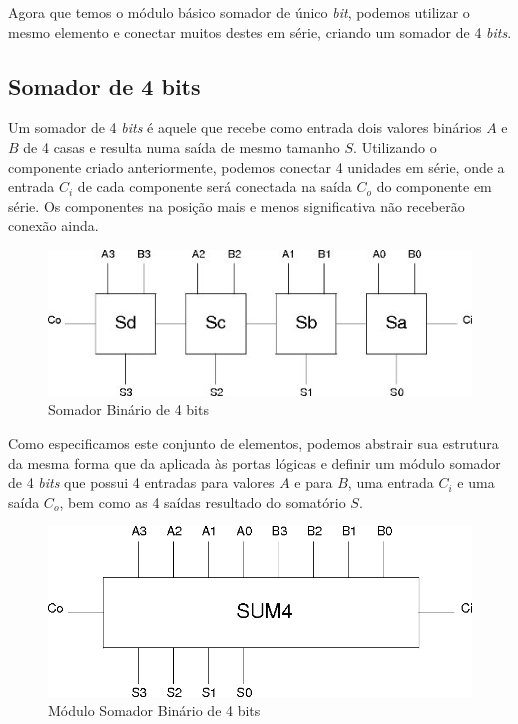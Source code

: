 \documentclass{article}
\begin{document}
Agora que temos o módulo básico somador de único \textit{bit}, podemos utilizar
o mesmo elemento e conectar muitos destes em série, criando um somador de 4
\textit{bits}.

\subsection{Somador de 4 bits}
\label{sec:somador-de-4-bits}

Um somador de 4 \textit{bits} é aquele que recebe como entrada dois valores
binários $A$ e $B$ de 4 casas e resulta numa saída de mesmo tamanho $S$.
Utilizando o componente criado anteriormente, podemos conectar 4 unidades em
série, onde a entrada $C_i$ de cada componente será conectada na saída $C_o$ do
componente em série. Os componentes na posição mais e menos significativa não
receberão conexão ainda.

\begin{figure}
    \centering{}
    \includegraphics[scale=0.8]{sources/sums.jpg}
    \caption{Somador Binário de 4 bits}
    \label{fig:sums}
\end{figure}

Como especificamos este conjunto de elementos, podemos abstrair sua estrutura da
mesma forma que da aplicada às portas lógicas e definir um módulo somador de 4
\textit{bits} que possui 4 entradas para valores $A$ e para $B$, uma entrada
$C_i$ e uma saída $C_o$, bem como as 4 saídas resultado do somatório $S$.

\begin{figure}
    \centering{}
    \includegraphics[scale=0.4]{sources/sum4.png}
    \caption{Módulo Somador Binário de 4 bits}
    \label{fig:sum4}
\end{figure}
\end{document}
